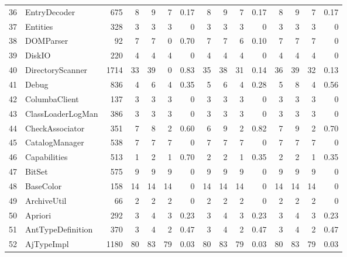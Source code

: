 \documentclass{acm_proc_article-sp}
\begin{document}
\begin{table} [htp!]
{\begin{tabularx}{1.17 \textwidth}{r l r r r r r r r r r r r r r}
 36						& EntryDecoder				&675		& 8		&	9	&	7	& 	0.17					& 8		& 9 		& 7		& 		0.17			& 8			& 9			& 7			&	0.17\\ 
 37						& Entities					&328		& 3		&	3	&	3	& 	0					& 3		& 3 		& 3		& 		0			& 3			& 3			& 3			&	0\\      
 38						& DOMParser				&92		& 7		&	7	&	0	& 	0.70					& 7		& 7 		& 6		& 		0.10			& 7			& 7			& 7			&	0\\      
 39						& DiskIO					&220		& 4		&	4	&	4	& 	0					& 4		& 4 		& 4		& 		0			& 4			& 4			& 4			&	0\\      
 40						& DirectoryScanner				&1714		& 33		&	39	&	0	& 	0.83					& 35		& 38 		& 31		& 		0.14			& 36			& 39			& 32			&	0.13\\      
 41						& Debug					&836		& 4		&	6	&	4	& 	0.35					& 5		& 6 		& 4		& 		0.28			& 5			& 8			& 4			&	0.56\\      
 42						& ColumbaClient				&137		& 3		&	3	&	3	& 	0					& 3		& 3 		& 3		& 		0			& 3			& 3			& 3			&	0\\      
 43						& ClassLoaderLogMan			&386		& 3		&	3	&	3	& 	0					& 3		& 3 		& 3		& 		0			& 3			& 3			& 3			&	0\\      
 44						& CheckAssociator				&351		& 7		&	8	&	2	& 	0.60					& 6		& 9 		& 2		& 		0.82			& 7			& 9			& 2			&	0.70\\      
 45						& CatalogManager				&538		& 7		&	7	&	7	& 	0					& 7		& 7 		& 7		& 		0			& 7			& 7			& 7			&	0\\      
 46						& Capabilities				&513		& 1		&	2	&	1	& 	0.70					& 2		& 2 		& 1		& 		0.35			& 2			& 2			& 1			&	0.35\\      
 47						& BitSet					&575		& 9		&	9	&	9	& 	0					& 9		& 9 		& 9		& 		0			& 9			& 9			& 9			&	0\\      
 48						& BaseColor					&158		& 14		&	14	&	14	& 	0					& 14		& 14 		& 14		& 		0			& 14			& 14			& 14			&	0\\      
 49						& ArchiveUtil					&66		& 2		&	2	&	2	& 	0					& 2		& 2 		& 2		& 		0			& 2			& 2			& 2			&	0\\      
 50						& Apriori					&292		& 3		&	4	&	3	& 	0.23					& 3		& 4 		& 3		& 		0.23			& 3			& 4			& 3			&	0.23\\      
 51						& AntTypeDefinition				&370		& 3		&	4	&	2	& 	0.47					& 3		& 4 		& 2		& 		0.47			& 3			& 4			& 2			&	0.47\\      
 52						& AjTypeImpl					&1180		& 80		&	83	&	79	& 	0.03					& 80		& 83 		& 79		& 		0.03			& 80			& 83			& 79			&	0.03\\      

\end{tabularx}}
\end{table}
\end{document}
